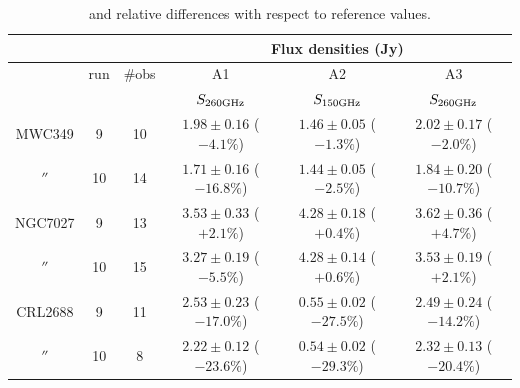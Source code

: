 \begin{table}[bh]
\begin{center}
\begin{tabular}{|c|c|c|c|c|c|}
\hline
\multicolumn{3}{|c}{}  & \multicolumn{3}{|c|}{Flux  densities (Jy)}   \\
\hline\hline
         & run  & \#obs &  A1                        &  A2                        &           A3                  \\
         &      &       &  $S_{260 {\rm GHz}}$       &  $S_{150 {\rm GHz}}$       & $S_{260 {\rm GHz}}$         \\
\hline  
MWC349   &  9   & 10    &  $1.98\pm0.16$ ($-4.1\%$)  &  $1.46\pm0.05$ ($-1.3\%$)  &  $2.02\pm0.17$ ($-2.0\%$)     \\
  $''$   & 10   & 14    &  $1.71\pm0.16$ ($-16.8\%$) & $1.44\pm0.05$ ($-2.5\%$)   &  $1.84\pm0.20$ ($-10.7\%$)      \\ 
  \hline
NGC7027  &  9   & 13    &  $3.53\pm0.33$ ($+2.1\%$)  &  $4.28\pm0.18$ ($+0.4\%$)  & $3.62\pm0.36$ ($+4.7\%$)      \\
  $''$   & 10   & 15    &  $3.27\pm0.19$ ($-5.5\%$)  & $4.28\pm0.14$ ($+0.6\%$)   &  $3.53\pm0.19$ ($+2.1\%$)        \\ 
  \hline
CRL2688  &  9   & 11    &  $2.53\pm0.23$ ($-17.0\%$) &  $0.55\pm0.02$ ($-27.5\%$) &  $2.49\pm0.24$ ($-14.2\%$)    \\
  $''$   & 10   &  8    &  $2.22\pm0.12$ ($-23.6\%$) &  $0.54\pm0.02$ ($-29.3\%$) &  $2.32\pm0.13$ ($-20.4\%$)     \\
\hline
\end{tabular}
\caption[Flux densities from pipeline gaussian fit]{ and relative differences  with respect to reference values.}
\label{tab:flux_sec_NK}
\end{center}
\end{table}

\\

\\

